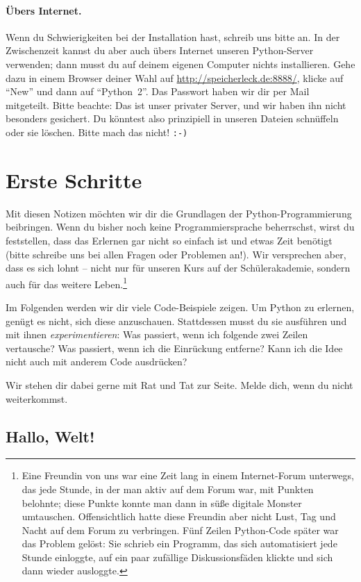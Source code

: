 \documentclass{blatt}
\begin{document}
\paragraph{Übers Internet.} Wenn du Schwierigkeiten bei der Installation hast,
schreib uns bitte an. In der Zwischenzeit kannst du aber auch übers Internet
unseren Python-Server verwenden; dann musst du auf deinem eigenen Computer
nichts installieren. Gehe dazu in einem Browser deiner Wahl auf
\url{http://speicherleck.de:8888/}, klicke auf "`New"' und dann auf
"`Python~2"'. Das Passwort haben wir dir per Mail mitgeteilt. Bitte
beachte: Das ist unser privater Server, und wir haben ihn nicht besonders
gesichert. Du könntest also prinzipiell in unseren Dateien schnüffeln oder sie
löschen. Bitte mach das nicht! \texttt{:-)}


\section{Erste Schritte}

Mit diesen Notizen möchten wir dir die Grundlagen der Python-Programmierung
beibringen. Wenn du bisher noch keine Programmiersprache beherrschst, wirst du
feststellen, dass das Erlernen gar nicht so einfach ist und etwas
Zeit benötigt (bitte schreibe uns bei allen Fragen oder Problemen an!). Wir
versprechen aber, dass es sich lohnt -- nicht nur für unseren Kurs auf der
Schülerakademie, sondern auch für das weitere Leben.\footnote{Eine Freundin von
uns war eine Zeit lang in einem Internet-Forum unterwegs, das jede Stunde, in
der man aktiv auf dem Forum war, mit Punkten belohnte; diese Punkte konnte man
dann in süße digitale Monster umtauschen. Offensichtlich hatte diese Freundin
aber nicht Lust, Tag und Nacht auf dem Forum zu verbringen. Fünf Zeilen
Python-Code später war das Problem gelöst: Sie schrieb ein Programm,
das sich automatisiert jede Stunde einloggte, auf ein paar zufällige
Diskussionsfäden klickte und sich dann wieder ausloggte.}

Im Folgenden werden wir dir viele Code-Beispiele zeigen. Um Python zu erlernen,
genügt es nicht, sich diese anzuschauen. Stattdessen musst du sie ausführen und
mit ihnen \emph{experimentieren}: Was passiert, wenn ich folgende zwei Zeilen
vertausche? Was passiert, wenn ich die Einrückung entferne? Kann ich die Idee
nicht auch mit anderem Code ausdrücken?

Wir stehen dir dabei gerne mit Rat und Tat zur Seite. Melde dich, wenn du nicht
weiterkommst.


\subsection{Hallo, Welt!}
\end{document}
